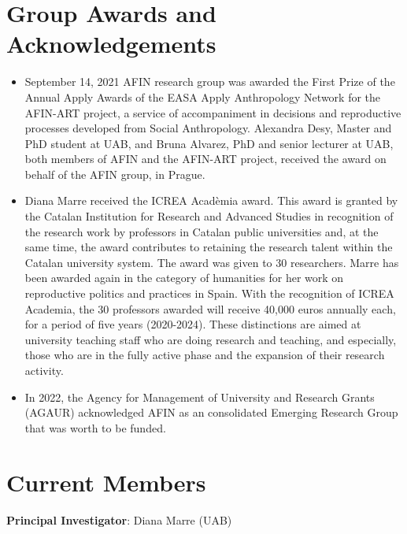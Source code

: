 \documentclass[english,a4paper,12pt,titlepage]{report}
\begin{document}
	\chapter{Group Awards and Acknowledgements}
	\begin{itemize}
		\item September 14, 2021 AFIN research group was awarded the First Prize of the Annual Apply Awards of the EASA Apply Anthropology Network for the AFIN-ART project, a service of accompaniment in decisions and reproductive processes developed from Social Anthropology. Alexandra Desy, Master and PhD student at UAB, and Bruna Alvarez, PhD and senior lecturer at UAB, both members of AFIN and the AFIN-ART project, received the award on behalf of the AFIN group, in Prague.
		\item Diana Marre received the ICREA Acadèmia award. This award is granted by the Catalan Institution for Research and Advanced Studies in recognition of the research work by professors in Catalan public universities and, at the same time, the award contributes to retaining the research talent within the Catalan university system. The award was given to 30 researchers. Marre has been awarded again in the category of humanities for her work on reproductive politics and practices in Spain. With the recognition of ICREA Academia, the 30 professors awarded will receive 40,000 euros annually each, for a period of five years (2020-2024). These distinctions are aimed at university teaching staff who are doing research and teaching, and especially, those who are in the fully active phase and the expansion of their research activity.
		\item In 2022, the Agency for Management of University and Research Grants (AGAUR) acknowledged AFIN as an consolidated Emerging Research Group that was worth to be funded.
	\end{itemize}

	\chapter{Current Members}
	\centering\textbf{Principal Investigator}: Diana Marre (UAB)\\
	
\end{document}
